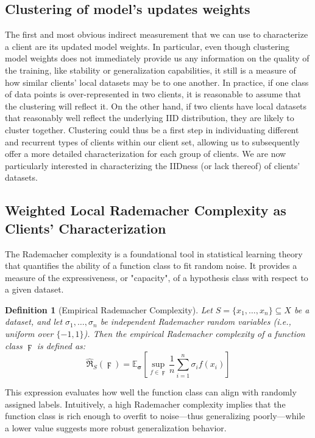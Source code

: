 \documentclass{article}
\newtheorem{definition}{Definition}
\begin{document}
\subsection{Clustering of model's updates weights}
The first and most obvious indirect measurement that we can use to characterize a client are its updated model weights. In particular, even though clustering model weights does not immediately provide us any information on the quality of the training, like stability or generalization capabilities, it still is a measure of how similar clients' local datasets may be to one another.
In practice, if one class of data points is over-represented in two clients, it is reasonable to assume that the clustering will reflect it. On the other hand, if two clients have local datasets that reasonably well reflect the underlying IID distribution, they are likely to cluster together. Clustering could thus be a first step in individuating different and recurrent types of clients within our client set, allowing us to subsequently offer a more detailed characterization for each group of clients. We are now particularly interested in characterizing the IIDness (or lack thereof) of clients' datasets.

\subsection{Weighted Local Rademacher Complexity as Clients' Characterization}

The Rademacher complexity is a foundational tool in statistical learning theory that quantifies the ability of a function class to fit random noise. It provides a measure of the expressiveness, or "capacity", of a hypothesis class with respect to a given dataset.

\begin{definition}[Empirical Rademacher Complexity]
Let \( S = \{x_1, \dots, x_n\} \subseteq X \) be a dataset, and let \( \sigma_1, \dots, \sigma_n \) be independent Rademacher random variables (i.e., uniform over \( \{-1, 1\} \)). Then the empirical Rademacher complexity of a function class \( \digamma \) is defined as:
\[
\hat{\mathfrak{R}}_S(\digamma) = \mathbb{E}_{\boldsymbol{\sigma}} \left[ \sup_{f \in \digamma} \frac{1}{n} \sum_{i=1}^{n} \sigma_i f(x_i) \right]
\]
\end{definition}

This expression evaluates how well the function class can align with randomly assigned labels. Intuitively, a high Rademacher complexity implies that the function class is rich enough to overfit to noise—thus generalizing poorly—while a lower value suggests more robust generalization behavior.
\end{document}
